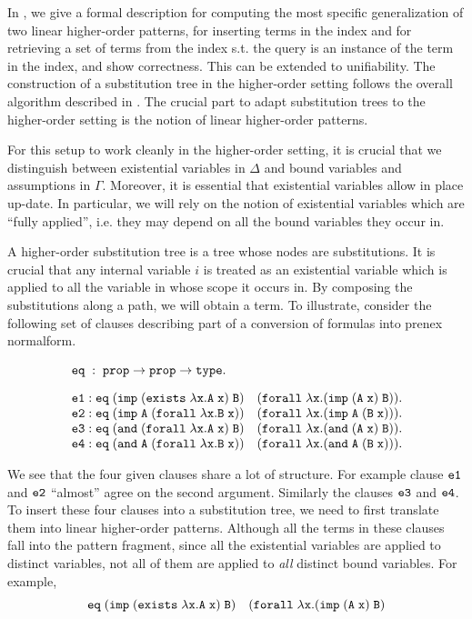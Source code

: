 \documentclass{acmconf}
\newcommand{\typeLF}{\tt{type}}
\newcommand{\propLF}{\tt{prop}}
\newcommand{\andLF}{\tt{and}\;}
\newcommand{\impLF}{\tt{imp}\;}
\newcommand{\forallLF}{\tt{forall}\;}
\newcommand{\existsLF}{\tt{exists}\;}
\newcommand{\eqLF}{\tt{eq}\;}
\newcommand{\eqilLF}{\tt{e1}}
\newcommand{\eqirLF}{\tt{e2}}
\newcommand{\eqalLF}{\tt{e3}}
\newcommand{\eqarLF}{\tt{e4}}
\begin{document}
 In \cite{Pientka:ICLP03,Pientka03phd}, we give a formal 
description for computing the most specific generalization of two
linear higher-order patterns, for inserting terms in the index and for
retrieving a set of terms from the index s.t. the query is an instance
of the term in the index, and show correctness. This can be extended
to unifiability. The construction of a substitution tree in the higher-order setting
follows the overall algorithm described in
\cite{Ramakrishnan01:indexing}. The crucial part to adapt substitution
trees to the higher-order setting is the notion of linear higher-order
patterns.

For this setup to work cleanly in the higher-order
setting, it is crucial that we distinguish between existential
variables in $\Delta$ and bound variables and assumptions in
$\Gamma$. Moreover, it is essential that existential variables allow
in place up-date. In particular, we will rely on the notion of
existential variables which are ``fully applied'', i.e. they may
depend on all the bound variables they occur in.

A higher-order substitution tree is a tree whose
nodes are substitutions. It is crucial that any internal variable $i$
is treated as an existential variable which is applied to all the
variable in whose scope it occurs in. By composing the substitutions along a path,
we will obtain a term. To illustrate, consider the following
set of clauses describing part of a conversion of formulas into prenex
normalform. 

\begin{small}
\[
\begin{array}{l}
\eqLF :\;  \propLF \rightarrow \propLF \rightarrow \typeLF.\\[1em]
%
\eqilLF: \eqLF (\impLF (\existsLF \lambda x. A\; x)\; B)\quad (\forallLF \lambda x. (\impLF (A\; x)\; B)).\\
\eqirLF: \eqLF (\impLF A\; (\forallLF \lambda x. B\;x)) \quad (\forallLF \lambda x. (\impLF A \; (B\; x))).\\
\eqalLF: \eqLF (\andLF (\forallLF \lambda x. A \;x) \; B)\quad (\forallLF \lambda x. (\andLF (A\; x)\; B)).\\
\eqarLF: \eqLF (\andLF A \; (\forallLF \lambda x. B\; x)) \quad (\forallLF \lambda x. (\andLF A \; (B\;x))).\\
\end{array}
\]
\end{small}

We see that the four given clauses share a lot of structure. For
example clause $\eqilLF$ and $\eqirLF$ ``almost'' agree on the second
argument. Similarly the clauses $\eqalLF$ and $\eqarLF$. To insert
these four clauses into a substitution tree, we need to first
translate them into linear higher-order patterns. Although all the
terms in these clauses fall into the pattern fragment, since all the
existential variables are applied to distinct variables, not all of
them are applied to {\em{all}} distinct bound variables. For example, 
\[
\eqLF (\impLF (\existsLF \lambda x. A\; x)\; B)\quad (\forallLF
\lambda x. (\impLF (A\; x)\; B)
\]
\end{document}
